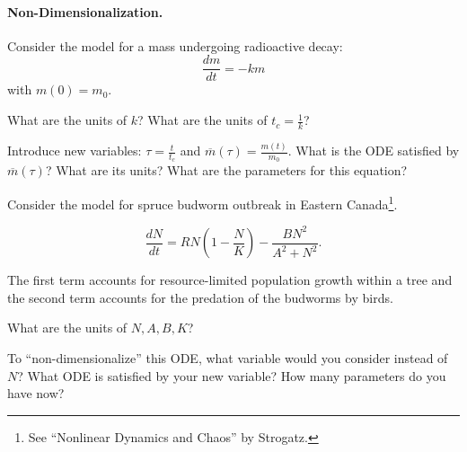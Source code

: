 \documentclass{workbook}
\begin{document}
\begin{slide}

\question \label{q:radioactive}

\paragraph{Non-Dimensionalization.}

Consider the model for a mass undergoing radioactive decay:
\[ \frac{dm}{dt} = -km \]
with $m(0) = m_0$.

\begin{parts}
	\item What are the units of $k$? What are the units of $t_c=\frac{1}{k}$? %

	\item Introduce new variables: $\tau = \frac{t}{t_c}$ and $\overline{m}(\tau) = \frac{m(t)}{m_0}$. What is the ODE satisfied by $\overline{m}(\tau)$? What are its units? What are the parameters for this equation?
	
\end{parts}
	
\end{slide}



\begin{slide}
\question \label{q:budworms}
	
\begin{problem}
Consider the model for spruce budworm outbreak in Eastern Canada\footnote{See ``Nonlinear Dynamics and Chaos'' by Strogatz.}.

\[
\frac{dN}{dt} = R N \left( 1 - \frac{N}{K} \right) - \frac{B N^2}{A^2 + N^2}.
\]

The first term accounts for resource-limited population growth within a tree and the second term accounts for the predation of the budworms by birds.
\end{problem}

\begin{parts}
	\item What are the units of $N, A, B, K$?
	


	\item To ``non-dimensionalize'' this ODE, what variable would you consider instead of $N$?  What ODE is satisfied by your new variable? How many parameters do you have now?
	

	
\end{parts}

\end{slide}
\end{document}
